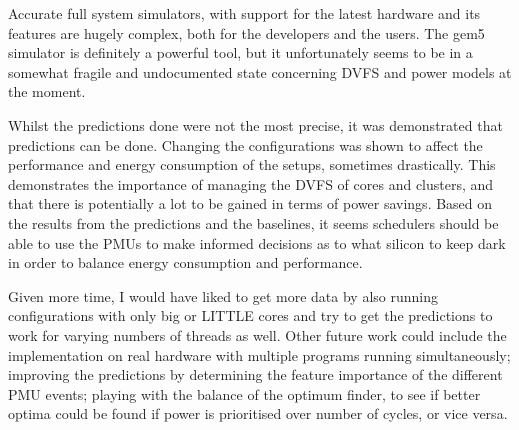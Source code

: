 Accurate full system simulators, with support for the latest hardware and its 
features are hugely complex, both for the developers and the users. The gem5 
simulator is definitely a powerful tool, but it unfortunately seems to be in a 
somewhat fragile and undocumented state concerning DVFS and power models at the 
moment.

Whilst the predictions done were not the most precise, it was demonstrated that 
predictions can be done. Changing the configurations was shown to affect the 
performance and energy consumption of the setups, sometimes drastically. This 
demonstrates the importance of managing the DVFS of cores and clusters, and that
there is potentially a lot to be gained in terms of power savings. Based on the 
results from the predictions and the baselines, it seems schedulers should be 
able to use the PMUs to make informed decisions as to what silicon to keep dark 
in order to balance energy consumption and performance.

Given more time, I would have liked to get more data by also running 
configurations with only big or LITTLE cores and try to get the predictions to 
work for varying numbers of threads as well. Other future work could include 
the implementation on real hardware with multiple programs running 
simultaneously; improving the predictions by determining the feature importance 
of the different PMU events; playing with the balance of the optimum finder, to 
see if better optima could be found if power is prioritised over number of 
cycles, or vice versa.
